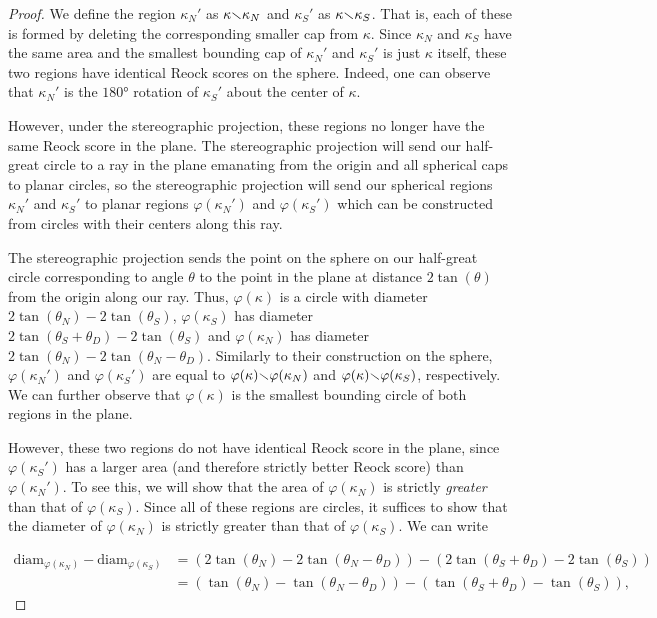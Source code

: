 \begin{proof}
  We define the region $\kappa_N'$ as $\kappa{\smallsetminus}\kappa_N$ and $\kappa_S'$ as $\kappa{\smallsetminus}\kappa_S$.  That is, each of these is formed by deleting the corresponding smaller cap from $\kappa$.  Since $\kappa_N$ and $\kappa_S$ have the same area and the smallest bounding cap of $\kappa_N'$ and $\kappa_S'$ is just $\kappa$ itself, these two regions have identical Reock scores on the sphere.  Indeed, one can observe that $\kappa_N'$ is the $\ang{180}$ rotation of $\kappa_S'$ about the center of $\kappa$.
  
  However, under the stereographic projection, these regions no longer have the same Reock score in the plane.  The stereographic projection will send our half-great circle to a ray in the plane emanating from the origin and all spherical caps to planar circles, so the stereographic projection will send our spherical regions $\kappa_N'$ and $\kappa_S'$ to planar regions $\varphi(\kappa_N')$ and $\varphi(\kappa_S')$ which can be constructed from circles with their centers along this ray.
  
  The stereographic projection sends the point on the sphere on our half-great circle corresponding to angle $\theta$ to the point in the plane at distance $2\tan(\theta)$ from the origin along our ray.  Thus, $\varphi(\kappa)$ is a circle with diameter $2\tan(\theta_N)-2\tan(\theta_S)$, $\varphi(\kappa_S)$ has diameter $2\tan(\theta_S+\theta_D)-2\tan(\theta_S)$ and $\varphi(\kappa_N)$ has diameter $2\tan(\theta_N)-2\tan(\theta_N-\theta_D)$.  Similarly to their construction on the sphere, $\varphi(\kappa_N')$ and $\varphi(\kappa_S')$ are equal to $\varphi(\kappa){\smallsetminus} \varphi(\kappa_N)$ and $\varphi(\kappa){\smallsetminus} \varphi(\kappa_S)$, respectively.  We can further observe that $\varphi(\kappa)$ is the smallest bounding circle of both regions in the plane.
  
  However, these two regions do not have identical Reock score in the plane, since $\varphi(\kappa_S')$ has a larger area (and therefore strictly better Reock score) than $\varphi(\kappa_N')$.  To see this, we will show that the area of $\varphi(\kappa_N)$ is strictly \textit{greater} than that of $\varphi(\kappa_S)$. Since all of these regions are circles, it suffices to show that the diameter of $\varphi(\kappa_N)$ is strictly {greater} than that of $\varphi(\kappa_S)$.  We can write
  
  \begin{align*}
  \mathrm{diam}_{\varphi(\kappa_N)} - \mathrm{diam}_{\varphi(\kappa_S)} &= \left(2\tan(\theta_N) - 2\tan(\theta_N-\theta_D)\right) - \left( 2\tan(\theta_S+\theta_D) - 2\tan(\theta_S) \right)\\
  &= \left(\tan(\theta_N) - \tan(\theta_N-\theta_D)\right) - \left( \tan(\theta_S+\theta_D) - \tan(\theta_S) \right),
  \end{align*}
  

\end{proof}

